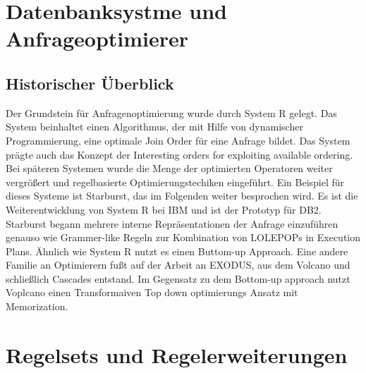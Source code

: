 








\section{Datenbanksystme und Anfrageoptimierer}

\subsection{Historischer Überblick}
Der Grundstein für Anfragenoptimierung wurde durch System R gelegt. Das System beinhaltet einen Algorithmus, der mit Hilfe von dynamischer Programmierung, eine optimale Join Order für eine Anfrage bildet. Das System prägte auch das Konzept der Interesting orders for exploiting available ordering. Bei späteren Systemen  wurde die Menge der optimierten Operatoren weiter vergrößert und regelbasierte Optimierungstechiken eingeführt. Ein Beispiel für dieses Systeme ist Starburst, das im Folgenden weiter besprochen wird. Es ist die Weiterentwicklung von System R bei IBM und ist der Prototyp für DB2. Starburst begann mehrere interne Repräsentationen der Anfrage einzuführen genauso wie Grammer-like Regeln zur Kombination von LOLEPOPs in Execution Plans. Ähnlich wie System R nutzt es einen Buttom-up Approach. Eine andere Familie an Optimierern fußt auf der Arbeit an EXODUS, aus dem Volcano und schließlich Cascades entstand. Im Gegensatz zu dem Bottom-up approach nutzt Voplcano einen Transformaiven Top down optimierungs Ansatz mit Memorization. 







\section{Regelsets und Regelerweiterungen}



